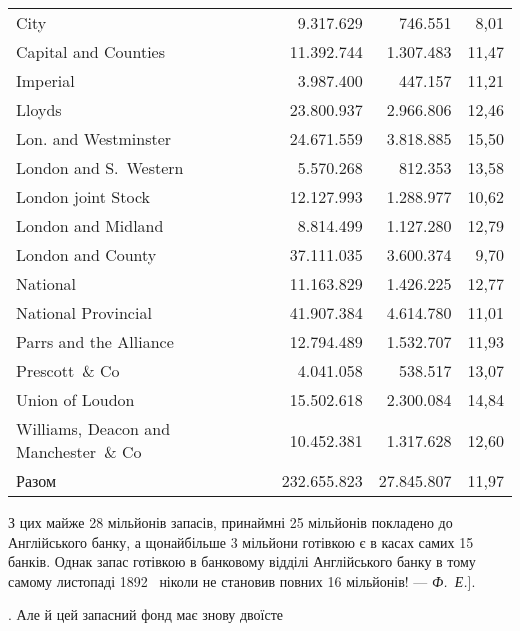 {\begin{tabularx}{\textwidth}{X r r r}
City \dotfill{}                                    & \num{9.317.629}  & \num{746.551}  & 8,01 \\
Capital and Counties \dotfill{}                   & \num{11.392.744} & \num{1.307.483} & 11,47 \\
Imperial \dotfill{}                               & \num{3.987.400}  & \num{447.157}  & 11,21 \\
Lloyds \dotfill{}                                 & \num{23.800.937} & \num{2.966.806} & 12,46 \\
Lon. and Westminster \dotfill{}                   & \num{24.671.559} & \num{3.818.885} & 15,50 \\
London and S.~Western \dotfill{}                  & \num{5.570.268}  & \num{812.353}  & 13,58 \\
London joint Stock \dotfill{}                     & \num{12.127.993} & \num{1.288.977} & 10,62 \\
London and Midland \dotfill{}                     & \num{8.814.499}  & \num{1.127.280} & 12,79 \\
London and County \dotfill{}                      & \num{37.111.035} & \num{3.600.374} & 9,70 \\
National \dotfill{}                               & \num{11.163.829} & \num{1.426.225} & 12,77 \\
National Provincial \dotfill{}                     & \num{41.907.384} & \num{4.614.780} & 11,01 \\
Parrs and the Alliance \dotfill{}                 & \num{12.794.489} & \num{1.532.707} & 11,93 \\
Prescott~\& Co \dotfill{}                        & \num{4.041.058}  & \num{538.517}  & 13,07 \\
Union of Loudon \dotfill{}                       & \num{15.502.618} & \num{2.300.084} & 14,84 \\
Williams, Deacon and Manchester~\& Co\dotfill{} & \num{10.452.381} & \num{1.317.628} & 12,60 \\
\cmidrule(lr){1-4}
Разом                                  & \num{232.655.823} & \num{27.845.807} & 11,97

  \end{tabularx}

\noindent{}З цих майже 28 мільйонів запасів, принаймні 25 мільйонів покладено до Англійського банку, а
щонайбільше 3 мільйони готівкою є в касах самих 15 банків. Однак запас готівкою в банковому відділі
Англійського банку в тому самому листопаді 1892~ ніколи не становив повних 16 мільйонів! — \emph{Ф.~Е.}].
}. Але й цей запасний фонд має знову двоїсте
